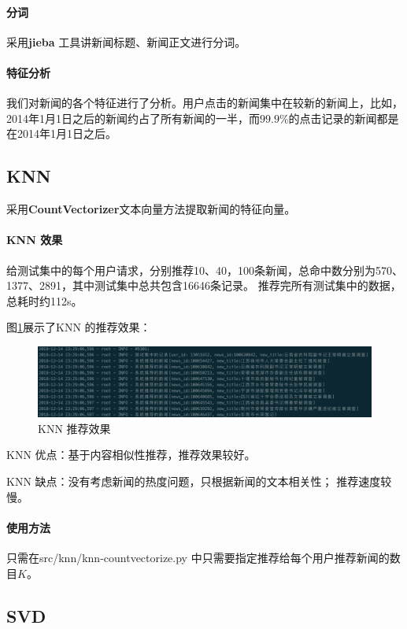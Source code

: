 \documentclass[UTF8]{article}
\begin{document}
\paragraph{分词} 采用\textbf{jieba} 工具讲新闻标题、新闻正文进行分词。
\paragraph{特征分析} 我们对新闻的各个特征进行了分析。用户点击的新闻集中在较新的新闻上，比如，2014年1月1日之后的新闻约占了所有新闻的一半，而$99.9\%$的点击记录的新闻都是在2014年1月1日之后。

\subsection{KNN}
采用\textbf{CountVectorizer}文本向量方法提取新闻的特征向量。

\paragraph{KNN 效果} 给测试集中的每个用户请求，分别推荐10、40，100条新闻，总命中数分别为570、1377、2891，其中测试集中总共包含16646条记录。 推荐完所有测试集中的数据，总耗时约112s。

图\ref{fig:knn-example}展示了KNN 的推荐效果：
\begin{figure}[ht]
    \centering
    \includegraphics[scale=0.23]{./figures/knn-example.jpg}
    \caption{KNN 推荐效果}
    \label{fig:knn-example}
\end{figure}

KNN 优点：基于内容相似性推荐，推荐效果较好。 

KNN 缺点：没有考虑新闻的热度问题，只根据新闻的文本相关性； 推荐速度较慢。

\paragraph{使用方法} 只需在src/knn/knn-countvectorize.py 中只需要指定推荐给每个用户推荐新闻的数目$K$。

\subsection{SVD}
\end{document}
